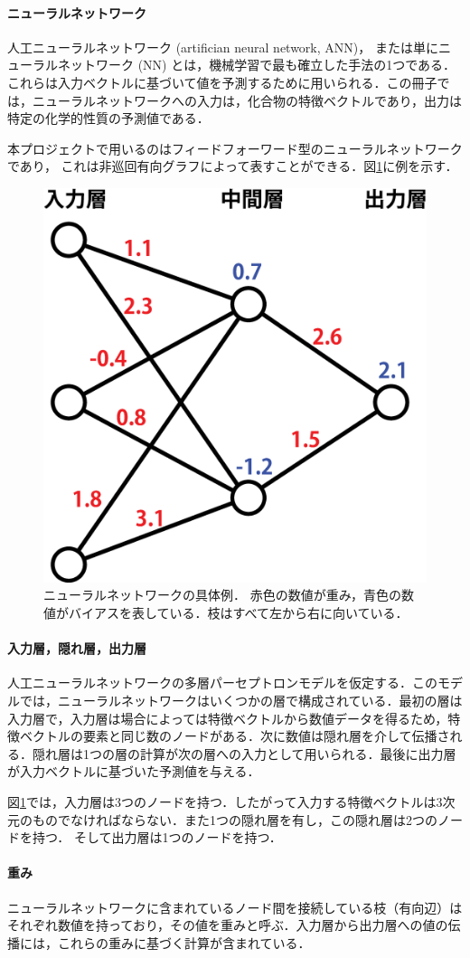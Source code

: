 \documentclass[11pt,dvipdfmx,twoside]{jarticle}
\newcommand{\figref}[1]{図\ref{fig:#1}}
\begin{document}
\paragraph{ニューラルネットワーク}
人工ニューラルネットワーク (artifician neural network, ANN)，
または単にニューラルネットワーク (NN) とは，機械学習で最も確立した手法の1つである．これらは入力ベクトルに基づいて値を予測するために用いられる．この冊子では，ニューラルネットワークへの入力は，化合物の特徴ベクトルであり，出力は特定の化学的性質の予測値である．

本プロジェクトで用いるのはフィードフォーワード型のニューラルネットワークであり，
これは非巡回有向グラフによって表すことができる．\figref{sample}に例を示す．

\begin{figure}[h!]
  \centering
  \includegraphics[width = 0.4 \textwidth]{./fig/ANN_sample_jp}
  \caption{ニューラルネットワークの具体例．
  赤色の数値が重み，青色の数値がバイアスを表している．枝はすべて左から右に向いている．}
  \label{fig:sample}
\end{figure}

\paragraph{入力層，隠れ層，出力層}
人工ニューラルネットワークの多層パーセプトロンモデルを仮定する．このモデルでは，ニューラルネットワークはいくつかの層で構成されている．最初の層は入力層で，入力層は場合によっては特徴ベクトルから数値データを得るため，特徴ベクトルの要素と同じ数のノードがある．次に数値は隠れ層を介して伝播される．隠れ層は1つの層の計算が次の層への入力として用いられる．最後に出力層が入力ベクトルに基づいた予測値を与える．

\figref{sample}では，入力層は3つのノードを持つ．したがって入力する特徴ベクトルは3次元のものでなければならない．また1つの隠れ層を有し，この隠れ層は2つのノードを持つ．
そして出力層は1つのノードを持つ．

\paragraph{重み}
ニューラルネットワークに含まれているノード間を接続している枝（有向辺）はそれぞれ数値を持っており，その値を重みと呼ぶ．入力層から出力層への値の伝播には，これらの重みに基づく計算が含まれている．
\end{document}
